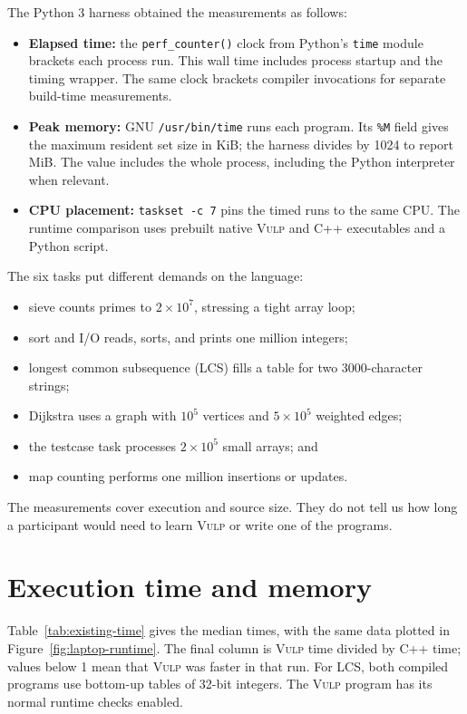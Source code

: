 \documentclass[12pt,a4paper]{report}
\newcommand{\vulp}{\textsc{Vulp}}
\begin{document}
The Python 3 harness obtained the measurements as follows:
\begin{itemize}
\item \textbf{Elapsed time:} the \texttt{perf\_counter()} clock from Python's \texttt{time} module brackets each process run. This wall time includes process startup and the timing wrapper. The same clock brackets compiler invocations for separate build-time measurements.
\item \textbf{Peak memory:} GNU \texttt{/usr/bin/time} runs each program. Its \texttt{\%M} field gives the maximum resident set size in KiB; the harness divides by 1024 to report MiB. The value includes the whole process, including the Python interpreter when relevant.
\item \textbf{CPU placement:} \texttt{taskset -c 7} pins the timed runs to the same CPU. The runtime comparison uses prebuilt native \vulp{} and C++ executables and a Python script.
\end{itemize}

The six tasks put different demands on the language:
\begin{itemize}
\item sieve counts primes to $2\times10^7$, stressing a tight array loop;
\item sort and I/O reads, sorts, and prints one million integers;
\item longest common subsequence (LCS) fills a table for two 3000-character strings;
\item Dijkstra uses a graph with $10^5$ vertices and $5\times10^5$ weighted edges;
\item the testcase task processes $2\times10^5$ small arrays; and
\item map counting performs one million insertions or updates.
\end{itemize}
The measurements cover execution and source size. They do not tell us how long a participant would need to learn \vulp{} or write one of the programs.

\section{Execution time and memory}
Table~\ref{tab:existing-time} gives the median times, with the same data plotted in Figure~\ref{fig:laptop-runtime}. The final column is \vulp{} time divided by C++ time; values below 1 mean that \vulp{} was faster in that run. For LCS, both compiled programs use bottom-up tables of 32-bit integers. The \vulp{} program has its normal runtime checks enabled.
\end{document}
